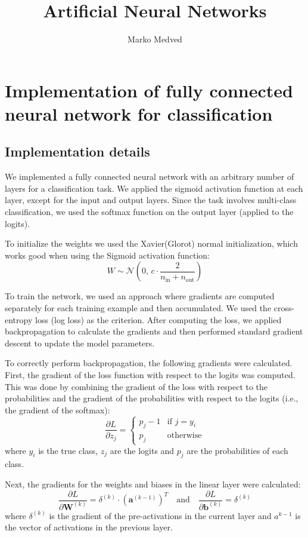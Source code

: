 \documentclass[9pt]{IEEEtran}
\title{\vspace{0ex}
Artificial Neural Networks}
\author{Marko Medved\vspace{-4.0ex}}
\begin{document}
\maketitle

\section{Implementation of fully connected neural network for classification}
\subsection{Implementation details}
We implemented a fully connected neural network with an arbitrary number of layers for
 a classification task. We applied the sigmoid activation function at each layer, except
  for the input and output layers. Since the task involves multi-class classification,
   we used the softmax function on the output layer (applied to the logits).

   To initialize the weights we used the Xavier(Glorot) normal initialization, which works good
   when using the Sigmoid activation function: 
   \[
    W \sim \mathcal{N}\left(0, \, c \cdot \frac{2}{n_\text{in} + n_\text{out}}\right)
   \]

To train the network, we used an approach where gradients are computed 
separately for each training example and then accumulated. We used the 
cross-entropy loss (log loss) as the criterion. After computing the loss,
 we applied backpropagation to calculate the gradients and then performed 
 standard gradient descent to update the model parameters. 

 To correctly perform backpropagation, the following gradients were calculated. 
 First, the gradient of the loss function with respect to the logits was computed. 
 This was done by combining the gradient of the loss with respect to the probabilities 
 and the gradient of the probabilities with respect to the logits (i.e., the gradient of the softmax):
\[
\frac{\partial L}{\partial z_j} =
\begin{cases}
p_j - 1 & \text{if } j = y_i \\
p_j & \text{otherwise}
\end{cases}
\]
where $y_i$ is the true class, $z_j$ are the logits and $p_j$ are the probabilities of 
each class. 

Next, the gradients for the weights and biases in the linear layer were calculated:
\[
\frac{\partial L}{\partial \mathbf{W}^{(k)}} = \delta^{(k)} \cdot \left( \mathbf{a}^{(k-1)} \right)^T
\quad \text{and} \quad
\frac{\partial L}{\partial \mathbf{b}^{(k)}} = \delta^{(k)}
\]
where $ \delta^{(k)}$ is the gradient of the  pre-activations in the current layer and $a^{k-1}$ is the 
vector of activations in the previous layer. 
\end{document}
